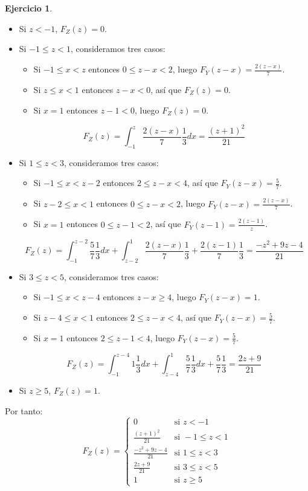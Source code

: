 \documentclass{report}
\theoremstyle{remark}
\theoremstyle{remark}
\theoremstyle{remark}
\theoremstyle{definition}
\theoremstyle{definition}
\theoremstyle{definition}
\theoremstyle{definition}
\newtheorem*{exercise}{Ejercicio}
\begin{document}
\begin{exercise}
    \begin{itemize}
        \item Si $z < -1$, $F_Z(z) = 0$.
        \item Si $-1 \leq z < 1$, consideramos tres casos:
              \begin{itemize}
                  \item Si $-1 \leq x < z$ entonces $0 \leq z-x < 2$, luego $F_Y(z-x) = \frac{2(z-x)}{7}$.
                  \item Si $z \leq x < 1$ entonces $z-x < 0$, así que $F_Z(z) = 0$.
                  \item Si $x = 1$ entonces $z-1 < 0$, luego $F_Z(z) = 0$.
              \end{itemize}
              $$F_Z(z) = \int_{-1}^z \frac{2(z-x)}{7}\frac{1}{3}dx = \frac{(z+1)^2}{21}$$
        \item Si $1 \leq z < 3$, consideramos tres casos:
              \begin{itemize}
                  \item Si $-1 \leq x < z-2$ entonces $2 \leq z-x < 4$, así que $F_Y(z-x) = \frac{5}{7}$.
                  \item Si $z-2 \leq x < 1$ entonces $0 \leq z-x < 2$, luego $F_Y(z-x) = \frac{2(z-x)}{7}$.
                  \item Si $x = 1$ entonces $0 \leq z-1 < 2$, así que $F_Y(z-1) = \frac{2(z-1)}{z}$.
              \end{itemize}
              $$F_Z(z) = \int_{-1}^{z-2} \frac{5}{7}\frac{1}{3}dx + \int_{z-2}^1 \frac{2(z-x)}{7}\frac{1}{3} + \frac{2(z-1)}{7}\frac{1}{3} = \frac{-z^2+9z-4}{21}$$
        \item Si $3 \leq z < 5$, consideramos tres casos:
              \begin{itemize}
                  \item Si $-1 \leq x < z-4$ entonces $z-x \geq 4$, luego $F_Y(z-x) = 1$.
                  \item Si $z-4 \leq x < 1$ entonces $2 \leq z-x < 4$, así que $F_Y(z-x) = \frac{5}{7}$.
                  \item Si $x = 1$ entonces $2 \leq z-1 < 4$, luego $F_Y(z-x) = \frac{5}{7}$.
              \end{itemize}
              $$F_Z(z) = \int_{-1}^{z-4} 1 \frac{1}{3}dx + \int_{z-4}^1 \frac{5}{7}\frac{1}{3}dx + \frac{5}{7}\frac{1}{3} = \frac{2z+9}{21}$$
        \item Si $z \geq 5$, $F_Z(z) = 1$.
    \end{itemize}
    Por tanto:
    $$F_Z(z) = \begin{cases}
            0                    & \text{si } z < -1        \\
            \frac{(z+1)^2}{21}   & \text{si } -1 \leq z < 1 \\
            \frac{-z^2+9z-4}{21} & \text{si } 1 \leq z < 3  \\
            \frac{2z+9}{21}      & \text{si } 3 \leq z < 5  \\
            1                    & \text{si } z \geq 5
        \end{cases}$$
\end{exercise}
\end{document}
